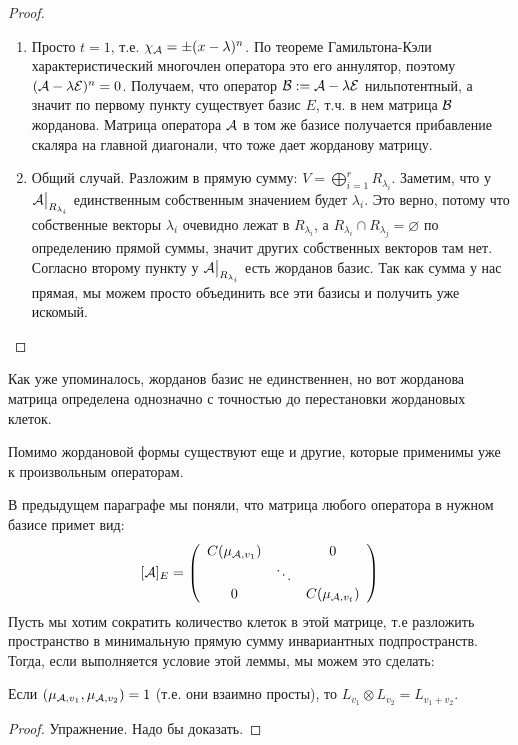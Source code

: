 \begin{proof}
\begin{enumerate}
        \item Просто $t = 1$, т.е. $\chi_{\mathcal{A}} = \pm (x - \lambda)^n$. 
        По теореме Гамильтона-Кэли характеристический многочлен оператора это его аннулятор, поэтому $(\mathcal{A} - \lambda \mathcal{E})^n = 0$. 
        Получаем, что оператор $\mathcal{B} := \mathcal{A} - \lambda \mathcal{E}$ нильпотентный, а значит по первому пункту существует базис $E$, т.ч. в нем матрица $\mathcal{B}$ жорданова. 
        Матрица оператора $\mathcal{A}$ в том же базисе получается прибавление скаляра на главной диагонали, что тоже дает жорданову матрицу.
        
        \item Общий случай. Разложим в прямую сумму: $V = \bigoplus\limits_{i = 1}^{r} R_{\lambda_i}$.
        Заметим, что у $\mathcal{A} \big|_{R_{\lambda_i}}$ единственным собственным значением будет $\lambda_i$.
        Это верно, потому что собственные векторы $\lambda_i$ очевидно лежат в $R_{\lambda_i}$, а $R_{\lambda_i} \cap R_{\lambda_j} = \varnothing$ по определению прямой суммы, значит других собственных векторов там нет.
        Согласно второму пункту у $\mathcal{A} \big|_{R_{\lambda_i}}$ есть жорданов базис.
        Так как сумма у нас прямая, мы можем просто объединить все эти базисы и получить уже искомый.
    \end{enumerate}
\end{proof}

\notice Как уже упоминалось, жорданов базис не единственнен, но вот жорданова матрица определена однозначно с точностью до перестановки жордановых клеток. 

\vspace*{5mm}

Помимо жордановой формы существуют еще и другие, которые применимы уже к произвольным операторам.

В предыдущем параграфе мы поняли, что матрица любого оператора в нужном базисе примет вид:
\[
  [ \mathcal{A} ]_{E} = \left(\begin{array}{ccc}
  C(\mu_{\mathcal{A}, v_1}) &  & 0 \\ 
   & \ddots &  \\ 
  0 &  & C(\mu_{\mathcal{A}, v_t})
  \end{array}\right)  
\]
Пусть мы хотим сократить количество клеток в этой матрице, т.е разложить пространство в минимальную прямую сумму инвариантных подпространств.
Тогда, если выполняется условие этой леммы, мы можем это сделать:
\begin{lemma}
    Если $(\mu_{\mathcal{A}, v_1}, \mu_{\mathcal{A}, v_2}) = 1$ (т.е. они взаимно просты), то $L_{v_1} \otimes L_{v_2} = L_{v_1 + v_2}$.
\end{lemma}
\begin{proof}
    Упражнение. Надо бы доказать.
\end{proof}

